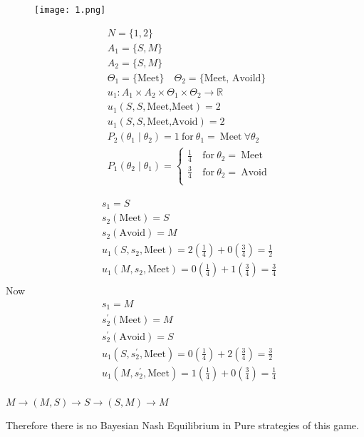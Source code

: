\documentclass[12pt,a4paper,fleqn]{article}
\begin{document}
\begin{figure}[H]
    \centering
    \texttt{[image: 1.png]}
\end{figure}

 \begin{align*}
    &N=\{1,2\}\\
    &A_{1}=\{S,M\}\\
    &A_{2}=\{S,M\}\\
    &\Theta_{1}=\{\text{Meet}\} \quad \Theta_{2}=\{\text{Meet, Avoild}\}\\
    &u_{1}: A_{1}\times A_{2}\times \Theta_{1} \times \Theta_{2} \rightarrow \mathbb{R}\\
    &u_{1}(S,S,\text{Meet,Meet})=2\\
    &u_{1}(S,S,\text{Meet,Avoid})=2\\
    &P_{2}(\theta_{1} \mid \theta_{2})= 1 \ \text{for} \ \theta_{1}= \ \text{Meet} \ \forall \theta_{2}\\
    &P_{1}(\theta_{2} \mid \theta_{1}) = \begin{cases} \frac{1}{4} & \ \text{for} \ \theta_{2}= \ \text{Meet} \\
    \frac{3}{4} & \ \text{for} \ \theta_{2}= \ \text{Avoid} \\
 \end{cases}
\end{align*}

 \begin{align*}
    &s_{1}=S \\
    &s_{2}(\text{Meet})=S \\
    &s_{2}(\text{Avoid})=M\\
    &u_{1}(S,s_{2},\text{Meet})=2\left( \frac{1}{4} \right) + 0 \left( \frac{3}{4} \right) = \frac{1}{2}\\
    &u_{1}(M,s_{2},\text{Meet})=0\left( \frac{1}{4} \right) + 1 \left( \frac{3}{4} \right) = \frac{3}{4}\\
\end{align*}
Now
\begin{align*}
    &s_{1}=M \\
    &s_{2}^{'}(\text{Meet})=M \\
    &s_{2}^{'}(\text{Avoid})=S\\  
    &u_{1}(S,s_{2}^{'},\text{Meet})=0\left( \frac{1}{4} \right) + 2 \left( \frac{3}{4} \right) = \frac{3}{2}\\
    &u_{1}(M,s_{2}^{'},\text{Meet})=1\left( \frac{1}{4} \right) + 0 \left( \frac{3}{4} \right) = \frac{1}{4} \\
\end{align*}

\(M \to (M,S) \to S \to (S,M) \to M\) 

Therefore there is no Bayesian Nash Equilibrium in Pure strategies of this game. 
\end{document}
